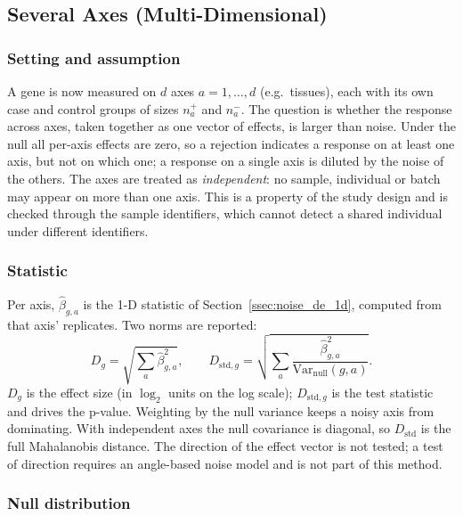     \subsection{Several Axes (Multi-Dimensional)}\label{ssec:noise_de_md}

        \subsubsection{Setting and assumption}

            A gene is now measured on $d$ axes $a = 1,\ldots,d$ (e.g.\ tissues), each with its own case and control groups of sizes $n^{+}_a$ and $n^{-}_a$. The question is whether the response across axes, taken together as one vector of effects, is larger than noise. Under the null all per-axis effects are zero, so a rejection indicates a response on at least one axis, but not on which one; a response on a single axis is diluted by the noise of the others. The axes are treated as \emph{independent}: no sample, individual or batch may appear on more than one axis. This is a property of the study design and is checked through the sample identifiers, which cannot detect a shared individual under different identifiers.

        \subsubsection{Statistic}

            Per axis, $\hat\beta_{g,a}$ is the 1-D statistic of Section~\ref{ssec:noise_de_1d}, computed from that axis' replicates. Two norms are reported:
            \[
                D_g = \sqrt{\sum_{a} \hat\beta_{g,a}^2}, \qquad
                D_{\mathrm{std},g} = \sqrt{\sum_{a} \frac{\hat\beta_{g,a}^2}{\mathrm{Var}_{\mathrm{null}}(g,a)}}.
            \]
            $D_g$ is the effect size (in $\log_2$ units on the log scale); $D_{\mathrm{std},g}$ is the test statistic and drives the p-value. Weighting by the null variance keeps a noisy axis from dominating. With independent axes the null covariance is diagonal, so $D_{\mathrm{std}}$ is the full Mahalanobis distance. The direction of the effect vector is not tested; a test of direction requires an angle-based noise model and is not part of this method.

        \subsubsection{Null distribution}

